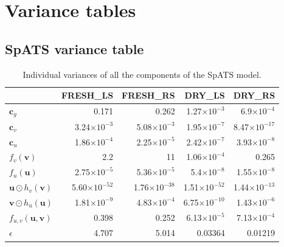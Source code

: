 \section{Variance tables}
\subsection{SpATS variance table}
\label{appendix:tab_spats_variances}

\begin{table}[ht]
\centering
{}
\caption{Individual variances of all the components of the SpATS model.} 
\begin{tabular}{lrrrr}
  \toprule
 & FRESH\_LS & FRESH\_RS & DRY\_LS & DRY\_RS \\ 
  \midrule
$\mathbf{c}_{g}$ & 0.171 & 0.262 & 1.27$\times 10^{-3}$ & 6.9$\times 10^{-4}$ \\ 
  $\mathbf{c}_{v}$ & 3.24$\times 10^{-3}$ & 5.08$\times 10^{-3}$ & 1.95$\times 10^{-7}$ & 8.47$\times 10^{-17}$ \\ 
  $\mathbf{c}_{u}$ & 1.86$\times 10^{-4}$ & 2.25$\times 10^{-5}$ & 2.42$\times 10^{-7}$ & 3.93$\times 10^{-8}$ \\ 
  $f_{v}(\mathbf{v})$ & 2.2 & 11 & 1.06$\times 10^{-4}$ & 0.265 \\ 
  $f_{u}(\mathbf{u})$ & 2.75$\times 10^{-5}$ & 5.36$\times 10^{-5}$ & 5.4$\times 10^{-8}$ & 1.55$\times 10^{-8}$ \\ 
  $\boldsymbol{u} \odot h_{v}(\boldsymbol{v})$ & 5.60$\times 10^{-52}$ & 1.76$\times 10^{-38}$ & 1.51$\times 10^{-52}$ & 1.44$\times 10^{-13}$ \\ 
  $\boldsymbol{v} \odot h_{u}(\boldsymbol{u})$ & 1.81$\times 10^{-9}$ & 4.83$\times 10^{-4}$ & 6.75$\times 10^{-10}$ & 1.43$\times 10^{-6}$ \\ 
  $f_{u, v}(\boldsymbol{u}, \boldsymbol{v})$ & 0.398 & 0.252 & 6.13$\times 10^{-5}$ & 7.13$\times 10^{-4}$ \\ 
  $\epsilon$ & 4.707 & 5.014 & 0.03364 & 0.01219\\
   \bottomrule
\end{tabular}
\label{tab:spats_variances}
\end{table}

